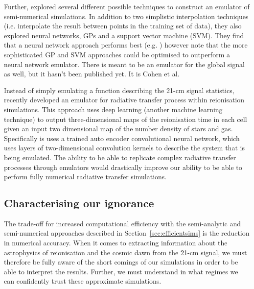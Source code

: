 Further, \cite{Jennings:2019} explored several different possible techniques to construct an emulator of semi-numerical simulations. In addition to two simplistic interpolation techniques (i.e. interpolate the result between points in the training set of data), they also explored neural networks, GPs and a support vector machine (SVM). They find that a neural network approach performs best (e.g. \cite{Schmit:2018}) however note that the more sophisticated GP and SVM approaches could be optimised to outperform a neural network emulator.
{\color{red} There is meant to be an emulator for the global signal as well, but it hasn't been published yet. It is Cohen et al.}

Instead of simply emulating a function describing the 21-cm signal statistics, recently \cite{Chardin:2019} developed an emulator for radiative transfer process within reionisation simulations. This approach uses deep learning (another machine learning technique) to output three-dimensional maps of the reionisation time in each cell given an input two dimensional map of the number density of stars and gas. Specifically is uses a trained auto encoder convolutional neural network, which uses layers of two-dimensional convolution kernels to describe the system that is being emulated. The ability to be able to replicate complex radiative transfer processes through emulators would drastically improve our ability to be able to perform fully numerical radiative transfer simulations.

\subsection{Characterising our ignorance}

The trade-off for increased computational efficiency with the semi-analytic and semi-numerical approaches described in Section~\ref{sec:efficientsims} is the reduction in numerical accuracy. When it comes to extracting information about the astrophysics of reionisation and the cosmic dawn from the 21-cm signal, we must therefore be fully aware of the short comings of our simulations in order to be able to interpret the results. Further, we must understand in what regimes we can confidently trust these approximate simulations.

